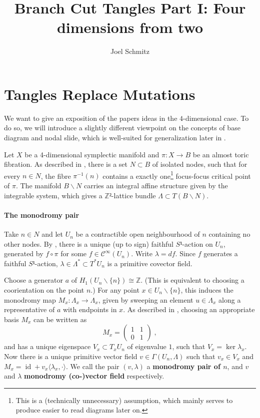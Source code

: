 \documentclass[12pt,a4paper,abstract=true,draft]{scrartcl}
\DeclareMathOperator{\id}{id}
\newcommand\mqty[1]{\begin{pmatrix}#1\end{pmatrix}}
\begin{document}
\title{Branch Cut Tangles Part I: Four dimensions from two}
\author{Joel Schmitz}
\maketitle

\section{Tangles Replace Mutations}

We want to give an exposition of the papers ideas in the $4$-dimensional case.
To do so, we will introduce a slightly different viewpoint on the concepts of base diagram and nodal slide, which is well-suited for generalization later in .

Let $X$ be a 4-dimensional symplectic manifold and $π \colon X → B$ be an almost toric fibration.
As described in \cite{evans2021atfs}, there is a set $N ⊂ B$ of isolated nodes, such that for every $n ∈ N$, the fibre $π^{-1}(n)$ contains a exactly one\footnote{This is a (technically unnecessary) assumption, which mainly serves to produce easier to read diagrams later on.} focus-focus critical point of $π$.
The manifold $B ∖ N$ carries an integral affine structure given by the integrable system, which gives a $ℤ²$-lattice bundle $Λ ⊂ T(B ∖ N)$.

\paragraph{The monodromy pair}
Take $n ∈ N$ and let $U_n$ be a contractible open neighbourhood of $n$ containing no other nodes.
By \cite[Proposition 1]{Zun97}, there is a unique (up to sign) faithful $S¹$-action on $U_n$, generated by $f ∘ π$ for some $f ∈ 𝒞^∞(U_n)$.
Write $λ = df$.
Since $f$ generates a faithful $S¹$-action, $λ ∈ Λ^* ⊂ T^* U_n$ is a primitive covector field.

Choose a generator $a$ of $H_1(U_n ∖ \{n\}) ≅ ℤ$. (This is equivalent to choosing a coorientation on the point $n$.)
For any point $x ∈ U_n ∖ \{n\}$, this induces the monodromy map $M_x \colon Λ_x → Λ_x$, given by sweeping an element $u ∈ Λ_x$ along a representative of $a$ with endpoints in $x$.
As described in \cite[Lemma 1]{Zun97}, choosing an appropriate basis $M_x$ can be written as
\[ M_x = \mqty{1 & 1\\0 & 1}\; ,\]
and has a unique eigenspace $V_x ⊂ T_x U_n$ of eigenvalue $1$, such that $V_x = \ker λ_x$.
Now there is a unique primitive vector field $v ∈ Γ(U_n,Λ)$ such that $v_x ∈ V_x$ and $M_x = \id + v_x ⟨ λ_x, · ⟩$.
We call the pair $(v,λ)$ a \textbf{monodromy pair of $n$}, and $v$ and $λ$ \textbf{monodromy (co-)vector field} respectively.
\end{document}
